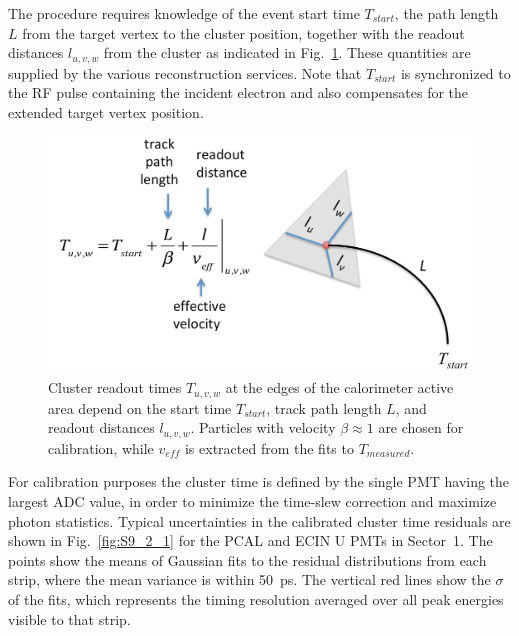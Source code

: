 The procedure requires knowledge of the event start time $T_{start}$, the path length $L$ from the target vertex
to the cluster position, together with the readout distances $l_{u,v,w}$ from the cluster as indicated in
Fig.~\ref{fig:S9_2_0}. These quantities are supplied by the various reconstruction services. Note that $T_{start}$
is synchronized to the RF pulse containing the incident electron and also compensates for the extended target
vertex position.

\begin{figure}[hbt]
\centering
\includegraphics[width=1.0\columnwidth,keepaspectratio]{img/S9_2_0.png}
\caption[]{Cluster readout times $T_{u,v,w}$ at the edges of the calorimeter active area depend on the start time
  $T_{start}$, track path length $L$, and readout distances $l_{u,v,w}$. Particles with velocity $\beta\approx 1$ are
  chosen for calibration, while $v_{eff}$ is extracted from the fits to $T_{measured}$.}
\label{fig:S9_2_0}
\end{figure}

For calibration purposes the cluster time is defined by the single PMT having the largest ADC value, in order to
minimize the time-slew correction and maximize photon statistics. Typical uncertainties in the calibrated cluster
time residuals are shown in Fig.~\ref{fig:S9_2_1} for the PCAL and ECIN U PMTs in Sector~1. The points show the
means of Gaussian fits to the residual distributions from each strip, where the mean variance is within 50~ps. The
vertical red lines show the $\sigma$ of the fits, which represents the timing resolution averaged over all peak
energies visible to that strip.  

